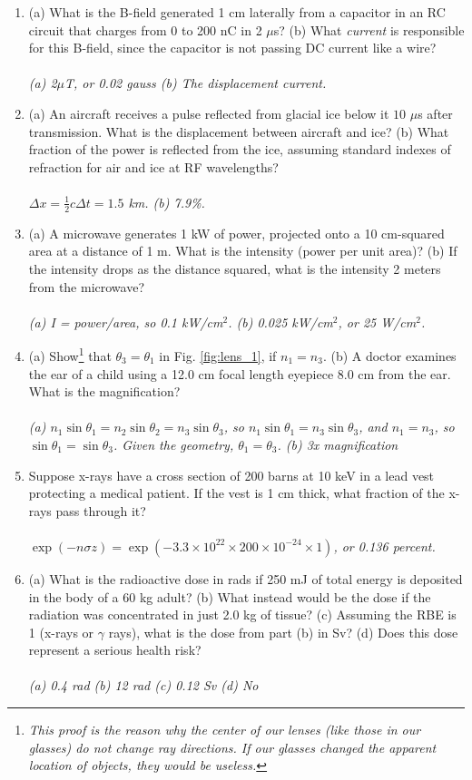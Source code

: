 \documentclass[12pt,twocolumn]{article}
\begin{document}
\noindent
\begin{enumerate}
\item (a) What is the B-field generated 1 cm laterally from a capacitor in an RC circuit that charges from 0 to 200 nC in 2 $\mu$s? (b) What \textit{current} is responsible for this B-field, since the capacitor is not passing DC current like a wire? \\ \\
\textit{(a) 2$\mu$T, or 0.02 gauss (b) The displacement current.}
\item (a) An aircraft receives a pulse reflected from glacial ice below it $10$ $\mu$s after transmission. What is the displacement between aircraft and ice? (b) What fraction of the power is reflected from the ice, assuming standard indexes of refraction for air and ice at RF wavelengths? \\ \\
\textit{$\Delta x = \frac{1}{2}c\Delta t = 1.5$ km. (b) 7.9\%.}
\item (a) A microwave generates 1 kW of power, projected onto a 10 cm-squared area at a distance of 1 m.  What is the intensity (power per unit area)? (b) If the intensity drops as the distance squared, what is the intensity 2 meters from the microwave? \\ \\
\textit{(a) I = power/area, so 0.1 kW/cm$^2$. (b) 0.025 kW/cm$^2$, or 25 W/cm$^2$.}
\item (a) Show\footnote{\textit{This proof is the reason why the center of our lenses (like those in our glasses) do not change ray directions.  If our glasses changed the apparent location of objects, they would be useless.}} that $\theta_3 = \theta_1$ in Fig. \ref{fig:lens_1}, if $n_1 = n_3$. (b) A doctor examines the ear of a child using a 12.0 cm focal length eyepiece 8.0 cm from the ear. What is the magnification? \\ \\
\textit{(a) $n_1 \sin\theta_1 = n_2 \sin\theta_2 = n_3 \sin\theta_3$, so $n_1\sin\theta_1 = n_3\sin\theta_3$, and $n_1 = n_3$, so $\sin\theta_1 = \sin\theta_3$.  Given the geometry, $\theta_1 = \theta_3$. (b) 3x magnification}
\item Suppose x-rays have a cross section of 200 barns at 10 keV in a lead vest protecting a medical patient.  If the vest is 1 cm thick, what fraction of the x-rays pass through it? \\ \\
\textit{$\exp(-n\sigma z) = \exp(-3.3\times 10^{22}\times 200 \times 10^{-24}\times 1)$, or 0.136 percent.}
\item (a) What is the radioactive dose in rads if 250 mJ of total energy is deposited in the body of a 60 kg adult? (b) What instead would be the dose if the radiation was concentrated in just 2.0 kg of tissue? (c) Assuming the RBE is 1 (x-rays or $\gamma$ rays), what is the dose from part (b) in Sv? (d) Does this dose represent a serious health risk? \\ \\
\textit{(a) 0.4 rad (b) 12 rad (c) 0.12 Sv (d) No}
\end{enumerate}
\end{document}
